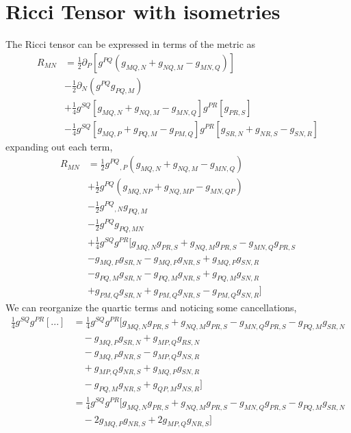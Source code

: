 \section{Ricci Tensor with isometries}
\label{sec:ricci tensor with isometries}
The Ricci tensor can be expressed in terms of the metric as
\begin{equation}
\begin{aligned}
R_{MN}
&= \frac{1}{2}\partial_P [g^{PQ}(g_{MQ,N} + g_{NQ,M} - g_{MN,Q})]\\
&-\frac{1}{2}\partial_N (g^{PQ}g_{PQ,M})\\
&+\frac{1}{4}g^{SQ}[g_{MQ,N} + g_{NQ,M} - g_{MN,Q}]g^{PR}[g_{PR,S}]\\
&-\frac{1}{4}g^{SQ}[g_{MQ,P} + g_{PQ,M} - g_{PM,Q}]g^{PR}[g_{SR,N} + g_{NR,S} - g_{SN,R}]
\end{aligned}
\end{equation}
expanding out each term, 
\begin{equation}
\begin{aligned}
R_{MN} &=
\frac{1}{2}g^{PQ}{}_{,P}(g_{MQ,N} + g_{NQ,M} - g_{MN,Q})\\
&+\frac{1}{2}g^{PQ}(g_{MQ,NP} + g_{NQ,MP} - g_{MN,QP})\\
&-\frac{1}{2}g^{PQ}{}_{,N}g_{PQ,M}\\
&-\frac{1}{2}g^{PQ}g_{PQ,MN}\\
&+\frac{1}{4}g^{SQ}g^{PR}[g_{MQ,N}g_{PR,S} + g_{NQ,M}g_{PR,S} - g_{MN,Q}g_{PR,S}\\
&- g_{MQ,P}g_{SR,N} - g_{MQ,P}g_{NR,S} + g_{MQ,P}g_{SN,R}\\
&- g_{PQ,M}g_{SR,N} - g_{PQ,M}g_{NR,S} + g_{PQ,M}g_{SN,R}\\
&+ g_{PM,Q}g_{SR,N} + g_{PM,Q}g_{NR,S} - g_{PM,Q}g_{SN,R}]
\end{aligned}
\end{equation}
We can reorganize the quartic terms and noticing some cancellations,
\begin{equation}
\begin{aligned}
\frac{1}{4}g^{SQ}g^{PR}[...]
&=
\frac{1}{4}g^{SQ}g^{PR}[
g_{MQ,N}g_{PR,S} + g_{NQ,M}g_{PR,S} - g_{MN,Q}g_{PR,S}- g_{PQ,M}g_{SR,N}\\
&\quad - g_{MQ,P}g_{SR,N}+ g_{MP,Q}g_{RS,N}\\
&\quad - g_{MQ,P}g_{NR,S}- g_{MP,Q}g_{NS,R}\\
&\quad +g_{MP,Q}g_{NR,S} + g_{MQ,P}g_{SN,R}\\
&\quad -g_{PQ,M}g_{NR,S} + g_{QP,M}g_{NS,R}]\\
&=
\frac{1}{4}g^{SQ}g^{PR}[
g_{MQ,N}g_{PR,S} + g_{NQ,M}g_{PR,S} - g_{MN,Q}g_{PR,S}- g_{PQ,M}g_{SR,N}\\
&\quad - 2g_{MQ,P}g_{NR,S} +2g_{MP,Q}g_{NR,S}]
\end{aligned}
\end{equation}
